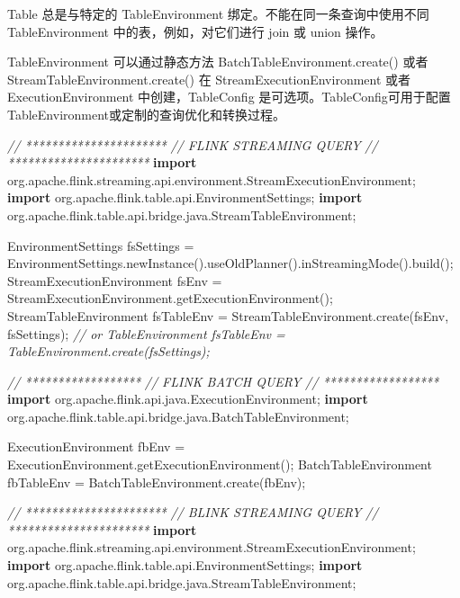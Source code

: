 \documentclass[cn,11pt,chinese]{elegantbook}
\newenvironment{Shaded}{}{}
\newcommand{\CommentTok}[1]{\textcolor[rgb]{0.38,0.63,0.69}{\textit{#1}}}
\newcommand{\FunctionTok}[1]{\textcolor[rgb]{0.02,0.16,0.49}{#1}}
\newcommand{\ImportTok}[1]{#1}
\newcommand{\KeywordTok}[1]{\textcolor[rgb]{0.00,0.44,0.13}{\textbf{#1}}}
\newcommand{\NormalTok}[1]{#1}
\begin{document}
Table 总是与特定的 TableEnvironment 绑定。不能在同一条查询中使用不同
TableEnvironment 中的表，例如，对它们进行 join 或 union 操作。

TableEnvironment 可以通过静态方法 BatchTableEnvironment.create() 或者
StreamTableEnvironment.create() 在 StreamExecutionEnvironment 或者
ExecutionEnvironment 中创建，TableConfig
是可选项。TableConfig可用于配置TableEnvironment或定制的查询优化和转换过程。

\begin{Shaded}
\begin{Highlighting}[]
\CommentTok{// **********************}
\CommentTok{// FLINK STREAMING QUERY}
\CommentTok{// **********************}
\KeywordTok{import}\ImportTok{ org.apache.flink.streaming.api.environment.StreamExecutionEnvironment;}
\KeywordTok{import}\ImportTok{ org.apache.flink.table.api.EnvironmentSettings;}
\KeywordTok{import}\ImportTok{ org.apache.flink.table.api.bridge.java.StreamTableEnvironment;}

\NormalTok{EnvironmentSettings fsSettings = EnvironmentSettings.}\FunctionTok{newInstance}\NormalTok{().}\FunctionTok{useOldPlanner}\NormalTok{().}\FunctionTok{inStreamingMode}\NormalTok{().}\FunctionTok{build}\NormalTok{();}
\NormalTok{StreamExecutionEnvironment fsEnv = StreamExecutionEnvironment.}\FunctionTok{getExecutionEnvironment}\NormalTok{();}
\NormalTok{StreamTableEnvironment fsTableEnv = StreamTableEnvironment.}\FunctionTok{create}\NormalTok{(fsEnv, fsSettings);}
\CommentTok{// or TableEnvironment fsTableEnv = TableEnvironment.create(fsSettings);}

\CommentTok{// ******************}
\CommentTok{// FLINK BATCH QUERY}
\CommentTok{// ******************}
\KeywordTok{import}\ImportTok{ org.apache.flink.api.java.ExecutionEnvironment;}
\KeywordTok{import}\ImportTok{ org.apache.flink.table.api.bridge.java.BatchTableEnvironment;}

\NormalTok{ExecutionEnvironment fbEnv = ExecutionEnvironment.}\FunctionTok{getExecutionEnvironment}\NormalTok{();}
\NormalTok{BatchTableEnvironment fbTableEnv = BatchTableEnvironment.}\FunctionTok{create}\NormalTok{(fbEnv);}

\CommentTok{// **********************}
\CommentTok{// BLINK STREAMING QUERY}
\CommentTok{// **********************}
\KeywordTok{import}\ImportTok{ org.apache.flink.streaming.api.environment.StreamExecutionEnvironment;}
\KeywordTok{import}\ImportTok{ org.apache.flink.table.api.EnvironmentSettings;}
\KeywordTok{import}\ImportTok{ org.apache.flink.table.api.bridge.java.StreamTableEnvironment;}


\end{Highlighting}
\end{Shaded}
\end{document}
